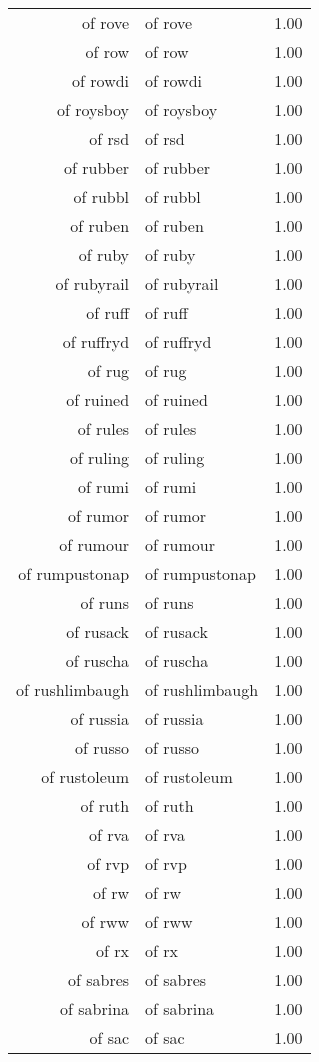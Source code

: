 \begin{table}[ht]
\begin{tabular}{rlr}
  of rove & of rove & 1.00 \\ 
  of row & of row & 1.00 \\ 
  of rowdi & of rowdi & 1.00 \\ 
  of roysboy & of roysboy & 1.00 \\ 
  of rsd & of rsd & 1.00 \\ 
  of rubber & of rubber & 1.00 \\ 
  of rubbl & of rubbl & 1.00 \\ 
  of ruben & of ruben & 1.00 \\ 
  of ruby & of ruby & 1.00 \\ 
  of rubyrail & of rubyrail & 1.00 \\ 
  of ruff & of ruff & 1.00 \\ 
  of ruffryd & of ruffryd & 1.00 \\ 
  of rug & of rug & 1.00 \\ 
  of ruined & of ruined & 1.00 \\ 
  of rules & of rules & 1.00 \\ 
  of ruling & of ruling & 1.00 \\ 
  of rumi & of rumi & 1.00 \\ 
  of rumor & of rumor & 1.00 \\ 
  of rumour & of rumour & 1.00 \\ 
  of rumpustonap & of rumpustonap & 1.00 \\ 
  of runs & of runs & 1.00 \\ 
  of rusack & of rusack & 1.00 \\ 
  of ruscha & of ruscha & 1.00 \\ 
  of rushlimbaugh & of rushlimbaugh & 1.00 \\ 
  of russia & of russia & 1.00 \\ 
  of russo & of russo & 1.00 \\ 
  of rustoleum & of rustoleum & 1.00 \\ 
  of ruth & of ruth & 1.00 \\ 
  of rva & of rva & 1.00 \\ 
  of rvp & of rvp & 1.00 \\ 
  of rw & of rw & 1.00 \\ 
  of rww & of rww & 1.00 \\ 
  of rx & of rx & 1.00 \\ 
  of sabres & of sabres & 1.00 \\ 
  of sabrina & of sabrina & 1.00 \\ 
  of sac & of sac & 1.00 \\ 

\end{tabular}
\end{table}
